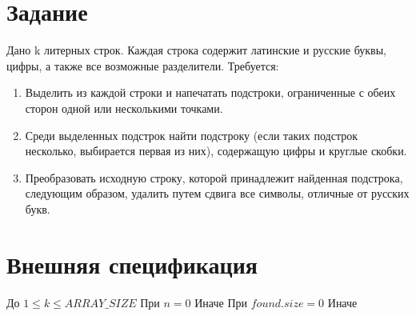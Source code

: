 

\renewcommand{\labnumber}{4}
\renewcommand{\tasks}{(5, 3, 2)}



\maketitle
\thispagestyle{empty}
\newpage
{}
\tableofcontents

\newpage
\section{Задание}

Дано k литерных строк. Каждая строка содержит латинские и русские буквы, цифры, а также все возможные разделители. Требуется:
\begin{enumerate}
    \item Выделить из каждой строки и напечатать подстроки,
        ограниченные с обеих сторон одной или несколькими точками.
    \item Среди выделенных подстрок найти подстроку (если таких
        подстрок несколько, выбирается первая из них), содержащую
        цифры и круглые скобки.
    \item Преобразовать исходную строку, которой принадлежит
        найденная подстрока, следующим образом, удалить путем сдвига
        все символы, отличные от русских букв.
\end{enumerate}

\newpage
\section{Внешняя спецификация}
\specframe{
    Лабораторная работа №\labnumber
}
До $1 \leq k \leq ARRAY\_SIZE$
При $n = 0$
Иначе
При $found.size = 0$
Иначе

